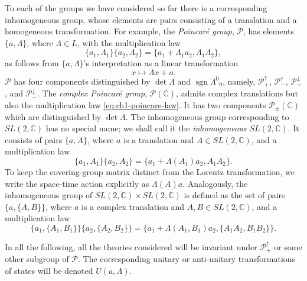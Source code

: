 To each of the groups we have considered so far there is a corresponding
inhomogeneous group, whose elements are pairs consisting of a translation and
a homogeneous transformation. For example, the \emph{Poincar\'e group},
$\mathcal P$, has elements $\{a,\Lambda\}$, where $\Lambda\in L$, with the multiplication
law
\begin{equation}
  \{a_1,\Lambda_1\}\{a_2,\Lambda_2\}
  =\{a_1+\Lambda_1a_2,\Lambda_1\Lambda_2\},
  \tag{1-22}\label{eq:ch1-poincare-law}
\end{equation}
as follows from $\{a,\Lambda\}$'s interpretation as a linear transformation
\[
  x\longmapsto\Lambda x+a.
\]
$\mathcal P$ has four components distinguished by $\det\Lambda$ and
$\operatorname{sgn}\Lambda^0{}_0$, namely, $\mathcal P^\uparrow_+$,
$\mathcal P^\uparrow_-$, $\mathcal P^\downarrow_+$, and
$\mathcal P^\downarrow_-$. The \emph{complex Poincar\'e group},
$\mathcal P(\mathbb C)$, admits complex translations but also the
multiplication law \eqref{eq:ch1-poincare-law}. It has two components $\mathcal P_\pm(\mathbb C)$
which are distinguished by $\det\Lambda$. The inhomogeneous group corresponding to
$SL(2,\mathbb C)$ has no special name; we shall call it the
\emph{inhomogeneous $SL(2,\mathbb C)$}. It consists of pairs $\{a,A\}$, where
$a$ is a translation and $A\in SL(2,\mathbb C)$, and a multiplication law
\begin{equation}
  \{a_1,A_1\}\{a_2,A_2\}
  =\{a_1+\Lambda(A_1)a_2,A_1A_2\}.
  \tag{1-23}\label{eq:ch1-inhomogeneous-sl2-law}
\end{equation}
To keep the covering-group matrix distinct from the Lorentz transformation,
we write the space-time action explicitly as $\Lambda(A)a$. Analogously, the
inhomogeneous group of $SL(2,\mathbb C)\times SL(2,\mathbb C)$ is defined as
the set of
pairs $\{a,\{A,B\}\}$, where $a$ is a complex translation and
$A,B\in SL(2,\mathbb C)$, and a multiplication law
\begin{equation}
  \{a_1,\{A_1,B_1\}\}\{a_2,\{A_2,B_2\}\}
  =
  \{a_1+\Lambda(A_1,B_1)a_2,\{A_1A_2,B_1B_2\}\}.
  \tag{1-24}\label{eq:ch1-inhomogeneous-complex-sl2-law}
\end{equation}

In all the following, all the theories considered will be invariant under
$\mathcal P^\uparrow_+$ or some other subgroup of $\mathcal P$. The
corresponding unitary or anti-unitary transformations of states will be
denoted $U(a,\Lambda)$.

